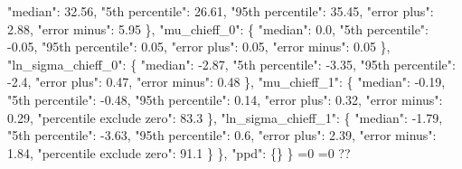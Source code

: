 {{          "median": 32.56, %
          "5th percentile": 26.61, %
          "95th percentile": 35.45, %
          "error plus": 2.88, %
          "error minus": 5.95%
        \}, %
        "mu\_chieff\_0": \{%
          "median": 0.0, %
          "5th percentile": {-}0.05, %
          "95th percentile": 0.05, %
          "error plus": 0.05, %
          "error minus": 0.05%
        \}, %
        "ln\_sigma\_chieff\_0": \{%
          "median": {-}2.87, %
          "5th percentile": {-}3.35, %
          "95th percentile": {-}2.4, %
          "error plus": 0.47, %
          "error minus": 0.48%
        \}, %
        "mu\_chieff\_1": \{%
          "median": {-}0.19, %
          "5th percentile": {-}0.48, %
          "95th percentile": 0.14, %
          "error plus": 0.32, %
          "error minus": 0.29, %
          "percentile exclude zero": 83.3%
        \}, %
        "ln\_sigma\_chieff\_1": \{%
          "median": {-}1.79, %
          "5th percentile": {-}3.63, %
          "95th percentile": 0.6, %
          "error plus": 2.39, %
          "error minus": 1.84, %
          "percentile exclude zero": 91.1%
        \}%
      \}, %
      "ppd": \{\}%
    \}}%
  \else%
    \ifnum{}=0%
      \let\qchieffLinearCorrelationModel@out\qchieffLinearCorrelationModel@I%
    \else%
      \ifnum{}=0%
      \let\qchieffLinearCorrelationModel@out\qchieffLinearCorrelationModel@II%
    \else%
      \def\qchieffLinearCorrelationModel@out{%
    ??}%
    \fi\fi
  \fi
  \qchieffLinearCorrelationModel@out
}\newcommand\qchieffLinearCorrelationModel@I[1][all]{%
  \ifnum\pdfstrcmp{#1}{all}=0%
    \def\qchieffLinearCorrelationModel@I@out{%
    \{%
      "alpha\_1": \{%
        "median": 2.04, %
        "5th percentile": 0.16, %
        "95th percentile": 3.38, %
        "error plus": 1.33, %
        "error minus": 1.88%
      \}, %
      "alpha\_2": \{%
        "median": 4.48, %
        "5th percentile": 3.1, %
        "95th percentile": 6.14, %
        "error plus": 1.66, %
        "error minus": 1.38%
      \}, %
      "beta": \{%
        "median": 1.25, %
        "5th percentile": 0.18, %
        "95th percentile": 2.76, %
        "error plus": 1.51, %
        "error minus": 1.07%
      \}, %
      "break\_mass": \{%
        "median": 35.29, %
        "5th percentile": 22.25, %
        "95th percentile": 48.35, %
        "error plus": 13.06, %
        "error minus": 13.04%
      \}, %
      "delta\_m\_1": \{%
        "median": 4.15, %
        "5th percentile": 0.28, %
        "95th percentile": 9.2, %
        "error plus": 5.05, %
        "error minus": 3.86%
}}
